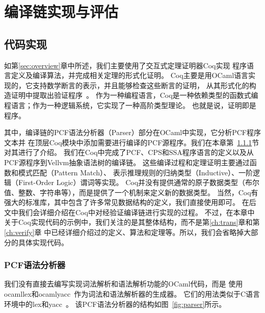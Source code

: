 
\chapter{编译链实现与评估} \label{ch:implement}

\section{代码实现}

如第\ref{sec:overview}章中所述，我们主要使用了交互式定理证明器Coq实现
程序语言定义及编译算法，并完成相关定理的形式化证明。
Coq主要是用OCaml语言实现的，它支持数学断言的表示，并且能够检查这些断言的证明，
从其形式化的构造证明中提取出验证程序~\cite{paulin2011introduction,chlipala2022certified}。
作为一种编程语言，Coq是一种依赖类型的函数式编程语言；作为一种逻辑系统，它实现了一种高阶类型理论。
也就是说，证明即是程序。

其中，编译链的PCF语法分析器（Parser）部分在OCaml中实现，它分析PCF程序文本并
在顶层Coq模块中添加需要进行编译的PCF源程序。我们在本章第~\ref{sec:pcfparser}节对其进行了介绍。
我们在Coq中完成了PCF、CPS和SSA程序语言的定义以及从PCF源程序到Vellvm抽象语法树的编译链。
这些编译过程和定理证明主要通过函数和模式匹配（Pattern Match）、
表示推理规则的归纳类型（Inductive）、一阶逻辑（First-Order Logic）谓词等实现。
Coq并没有提供通常的原子数据类型（布尔值、整数、字符串等），而是提供了一个机制来定义新的数据类型。
当然，Coq有强大的标准库，其中包含了许多常见数据结构的定义，我们直接使用即可。
在后文中我们会详细介绍在Coq中对经验证编译链进行实现的过程。
不过，在本章中关于Coq实现代码的示例中，我们关注的是其整体结构，而不是第\ref{ch:trans}章和第\ref{ch:verify}章
中已经详细介绍过的定义、算法和定理等。所以，我们会省略掉大部分的具体实现代码。

\subsection{PCF语法分析器} \label{sec:pcfparser}
我们没有直接去编写实现词法解析和语法解析功能的OCaml代码，而是
使用ocamllex和ocamlyacc~\cite{smith2007ocamllex}作为词法和语法解析器的生成器。
它们的用法类似于C语言环境中的lex和yacc~\cite{levine1992lex}。
该PCF语法分析器的结构如图~\ref{fig:parser}所示。


